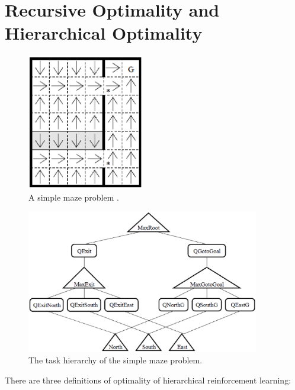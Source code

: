 
\section{Recursive Optimality and Hierarchical Optimality}
\begin{figure}[t]
\begin{center}
    \includegraphics[width=2in] {./figures/Maze.eps}
\end{center}
\caption{A simple maze problem \cite{MaxQJ}.}
\label{fig:Maze}
\end{figure}
\begin{figure}[t]
\begin{center}
    \includegraphics[width=4in] {./figures/MazeH.eps}
\end{center}
\caption{The task hierarchy of the simple maze problem.}
\label{fig:MazeH}
\end{figure}

There are three definitions of optimality of hierarchical reinforcement learning:

